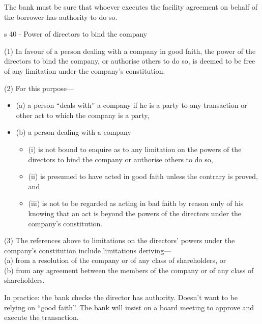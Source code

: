 \documentclass[
]{article}
\providecommand{\tightlist}{%
  \setlength{\itemsep}{0pt}\setlength{\parskip}{0pt}}
\newenvironment{env-a3e9d811-f68a-44b4-a14b-e49bc126ec2b}
{
    \savenotes\tcolorbox[blanker,breakable,left=5pt,borderline west={2pt}{-4pt}{green}]
}
{
    \endtcolorbox\spewnotes
}
\begin{document}
The bank must be sure that whoever executes the facility agreement on
behalf of the borrower has authority to do so.

\begin{env-a3e9d811-f68a-44b4-a14b-e49bc126ec2b}

s 40 - Power of directors to bind the company

(1) In favour of a person dealing with a company in good faith, the
power of the directors to bind the company, or authorise others to do
so, is deemed to be free of any limitation under the company's
constitution.

(2) For this purpose---

\begin{itemize}
\tightlist
\item
  (a) a person ``deals with'' a company if he is a party to any
  transaction or other act to which the company is a party,
\item
  (b) a person dealing with a company---

  \begin{itemize}
  \tightlist
  \item
    (i) is not bound to enquire as to any limitation on the powers of
    the directors to bind the company or authorise others to do so,
  \item
    (ii) is presumed to have acted in good faith unless the contrary is
    proved, and
  \item
    (iii) is not to be regarded as acting in bad faith by reason only of
    his knowing that an act is beyond the powers of the directors under
    the company's constitution.
  \end{itemize}
\end{itemize}

(3) The references above to limitations on the directors' powers under
the company's constitution include limitations deriving---\\
(a) from a resolution of the company or of any class of shareholders,
or\\
(b) from any agreement between the members of the company or of any
class of shareholders.

\end{env-a3e9d811-f68a-44b4-a14b-e49bc126ec2b}

In practice: the bank checks the director has authority. Doesn't want to
be relying on ``good faith''. The bank will insist on a board meeting to
approve and execute the transaction.
\end{document}
